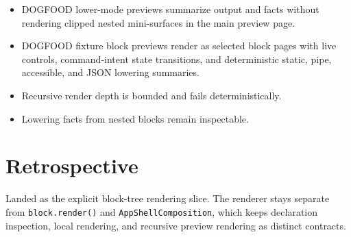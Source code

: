 \begin{itemize}
\item
  DOGFOOD lower-mode previews summarize output and facts without rendering clipped nested mini-surfaces in the main preview page.
\item
  DOGFOOD fixture block previews render as selected block pages with live controls, command-intent state transitions, and deterministic static, pipe, accessible, and JSON lowering summaries.
\item
  Recursive render depth is bounded and fails deterministically.
\item
  Lowering facts from nested blocks remain inspectable.
\end{itemize}

\section{Retrospective}\label{record-129-retrospective}

Landed as the explicit block-tree rendering slice. The renderer stays separate from \texttt{b\allowbreak{}l\allowbreak{}o\allowbreak{}c\allowbreak{}k\allowbreak{}.\allowbreak{}r\allowbreak{}e\allowbreak{}n\allowbreak{}d\allowbreak{}e\allowbreak{}r\allowbreak{}(\allowbreak{})} and \texttt{A\allowbreak{}p\allowbreak{}p\allowbreak{}S\allowbreak{}h\allowbreak{}e\allowbreak{}l\allowbreak{}l\allowbreak{}C\allowbreak{}o\allowbreak{}m\allowbreak{}p\allowbreak{}o\allowbreak{}s\allowbreak{}i\allowbreak{}t\allowbreak{}i\allowbreak{}o\allowbreak{}n}, which keeps declaration inspection, local rendering, and recursive preview rendering as distinct contracts.

